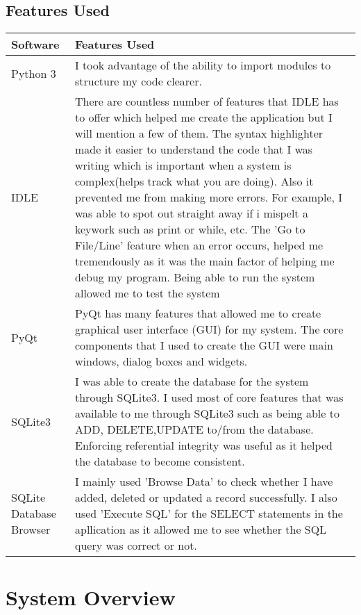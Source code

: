 \subsection{Features Used}

\begin{center}
\begin{tabular}{|p{4cm}|p{8.5cm}|}
\hline
\textbf{Software} & \textbf{Features Used} \\ \hline

Python 3 & I took advantage of the ability to import modules to structure my code clearer.  \\ \hline
IDLE & There are countless number of features that IDLE has to offer which helped me create the application but I will mention a few of them. The syntax highlighter made it easier to understand the code that I was writing which is important when a system is complex(helps track what you are doing). Also it prevented me from making more errors. For example, I was able to spot out straight away if i mispelt a keywork such as print or while, etc. The 'Go to File/Line' feature when an error occurs, helped me tremendously as it was the main factor of helping me debug my program. Being able to run the system allowed me to test the system \\ \hline
PyQt& PyQt has many features that allowed me to create graphical user interface (GUI) for my system. The core components that I used to create the GUI were main windows, dialog boxes and widgets. \\ \hline
SQLite3 &I was able to create the database for the system through SQLite3. I used most of core features that was available to me through SQLite3 such as being able to ADD, DELETE,UPDATE to/from the database. Enforcing referential integrity was useful as it helped the database to become consistent.   \\ \hline
SQLite Database Browser& I mainly used 'Browse Data' to check whether I have added, deleted or updated a record successfully. I also used 'Execute SQL' for the SELECT statements in the apllication as it allowed me to see whether the SQL query was correct or not.  \\ \hline

\end{tabular}
\end{center}

\section{System Overview}

